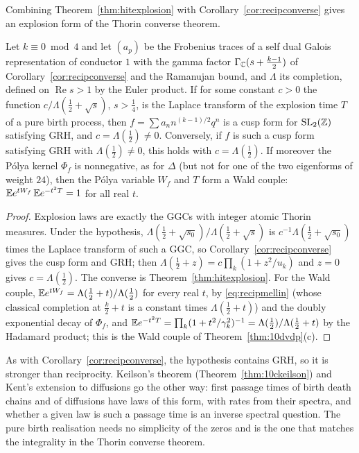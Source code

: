 Combining Theorem~\ref{thm:hitexplosion} with Corollary~\ref{cor:recipconverse} gives an explosion form of the Thorin converse theorem.

\begin{corollary}\label{cor:hitconverse}
Let $k\equiv0\bmod4$ and let $(a_p)$ be the Frobenius traces of a self dual Galois representation of conductor $1$ with the gamma factor $\Gamma_{\mathbb{C}}(s+\frac{k-1}2)$ of Corollary~\ref{cor:recipconverse} and the Ramanujan bound, and $\Lambda$ its completion, defined on $\operatorname{Re}s>1$ by the Euler product. If for some constant $c>0$ the function $c/\Lambda(\frac12+\sqrt s)$, $s>\frac14$, is the Laplace transform of the explosion time $T$ of a pure birth process, then $f=\sum a_nn^{(k-1)/2}q^n$ is a cusp form for $\mathrm{SL}_2(\mathbb{Z})$ satisfying GRH, and $c=\Lambda(\frac12)\ne0$. Conversely, if $f$ is such a cusp form satisfying GRH with $\Lambda(\frac12)\ne0$, this holds with $c=\Lambda(\frac12)$. If moreover the P\'olya kernel $\Phi_f$ is nonnegative, as for $\Delta$ (but not for one of the two eigenforms of weight $24$), then the P\'olya variable $W_f$ and $T$ form a Wald couple: $\mathbb{E} e^{tW_f}\,\mathbb{E} e^{-t^2T}=1$ for all real $t$.
\end{corollary}

\begin{proof}
Explosion laws are exactly the GGCs with integer atomic Thorin measures. Under the hypothesis, $\Lambda(\frac12+\sqrt{s_0})/\Lambda(\frac12+\sqrt s)$ is $c^{-1}\Lambda(\frac12+\sqrt{s_0})$ times the Laplace transform of such a GGC, so Corollary~\ref{cor:recipconverse} gives the cusp form and GRH; then $\Lambda(\frac12+z)=c\prod_k(1+z^2/u_k)$ and $z=0$ gives $c=\Lambda(\frac12)$. The converse is Theorem~\ref{thm:hitexplosion}. For the Wald couple, $\mathbb{E} e^{tW_f}=\Lambda(\frac12+t)/\Lambda(\frac12)$ for every real $t$, by \eqref{eq:recipmellin} (whose classical completion at $\frac k2+t$ is a constant times $\Lambda(\frac12+t)$) and the doubly exponential decay of $\Phi_f$, and $\mathbb{E} e^{-t^2T}=\prod_k(1+t^2/\gamma_k^2)^{-1}=\Lambda(\frac12)/\Lambda(\frac12+t)$ by the Hadamard product; this is the Wald couple of Theorem~\ref{thm:10dvdp}(c).
\end{proof}

As with Corollary~\ref{cor:recipconverse}, the hypothesis contains GRH, so it is stronger than reciprocity. Keilson's theorem (Theorem~\ref{thm:10ckeilson}) and Kent's extension to diffusions \cite{kent1980} go the other way: first passage times of birth death chains and of diffusions have laws of this form, with rates from their spectra, and whether a given law is such a passage time is an inverse spectral question. The pure birth realisation needs no simplicity of the zeros and is the one that matches the integrality in the Thorin converse theorem.

